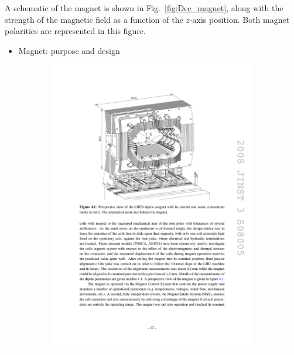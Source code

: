 A schematic of the magnet is shown in Fig.~\ref{fig:Dec_magnet}, along with the strength of the magnetic field as a function of the $z$-axis position. Both magnet polarities are represented in this figure. 

{\color{Red}
\begin{itemize}
\item Magnet: purpose and design 
\end{itemize}
}


\begin{figure}[!h]
    \centering
    \begin{subfigure}[t]{0.4\textwidth}
        \centering
        \includegraphics[width=1.0\textwidth]{figs/Detector/magnet_schematic.pdf}
    \end{subfigure}
    \begin{subfigure}[t]{0.4\textwidth}

\end{subfigure}
\end{figure}
